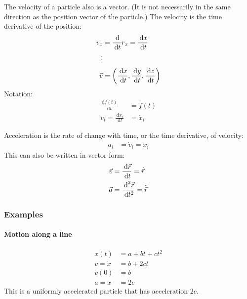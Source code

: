 \documentclass[pagesize,headsepline,10pt,parskip=half]{scrreprt}
\renewcommand\d[1]{\:\textrm{d}#1}
\begin{document}
        The velocity of a particle also is a vector.  (It is not necessarily in
        the same direction as the position vector of the particle.)  The
        velocity is the time derivative of the position:
        \begin{align*}
          v_x &= \frac{\d }{\d t} r_x =
          \frac{\d x}{\d t} \\
          \vdots \\
          \vec v &= \left(\frac{\d x}{\d t},
          \frac{\d y}{\d t},
          \frac{\d z}{\d t}\right)
        \end{align*}
        Notation:
        \begin{align*}
          \frac{\d f(t)}{\d t} &= \dot f(t) \\
          v_i = \frac{\d x_i}{\d t} &= \dot x_i
        \end{align*}

        Acceleration is the rate of change with time, or the time derivative, of
        velocity:
        \begin{align*}
          a_i &= \dot v_i = \ddot x_i
        \end{align*}
        This can also be written in vector form:
        \begin{align*}
          \vec v &= \frac{\d \vec r}{\d t} = \dot{\vec r} \\
          \vec a &= \frac{\d ^2\vec r}{\d t^2} = \ddot{\vec r}
        \end{align*}
        \subsubsection{Examples}
          \paragraph{Motion along a line}
            \begin{align*}
              x(t) &= a + bt + ct^2 \\
              v = \dot x &= b + 2ct \\
              v(0) &= b \\
              a = \ddot x &= 2c
            \end{align*}
            This is a uniformly accelerated particle that has acceleration $2c$.
\end{document}
